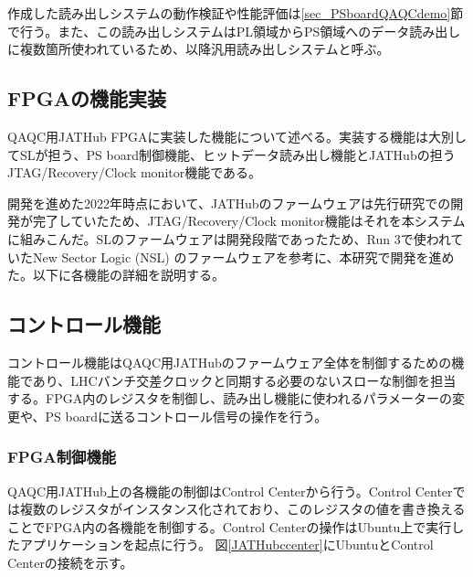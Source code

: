 作成した読み出しシステムの動作検証や性能評価は\ref{sec_PSboardQAQCdemo}節で行う。また、この読み出しシステムはPL領域からPS領域へのデータ読み出しに複数箇所使われているため、以降汎用読み出しシステムと呼ぶ。

\subsection{FPGAの機能実装}
\label{subsec_function}
QAQC用JATHub FPGAに実装した機能について述べる。実装する機能は大別してSLが担う、PS board制御機能、ヒットデータ読み出し機能とJATHubの担うJTAG/Recovery/Clock monitor機能である。


開発を進めた2022年時点において、JATHubのファームウェアは先行研究での開発が完了していたため、JTAG/Recovery/Clock monitor機能はそれを本システムに組みこんだ。SLのファームウェアは開発段階であったため、Run 3で使われていたNew Sector Logic (NSL) のファームウェアを参考に、本研究で開発を進めた。以下に各機能の詳細を説明する。

\subsection*{\textbf{コントロール機能}}
\label{subsubsec_control}
コントロール機能はQAQC用JATHubのファームウェア全体を制御するための機能であり、LHCバンチ交差クロックと同期する必要のないスローな制御を担当する。FPGA内のレジスタを制御し、読み出し機能に使われるパラメーターの変更や、PS boardに送るコントロール信号の操作を行う。

\subsubsection{FPGA制御機能}
QAQC用JATHub上の各機能の制御はControl Centerから行う。Control Centerでは複数のレジスタがインスタンス化されており、このレジスタの値を書き換えることでFPGA内の各機能を制御する。Control Centerの操作はUbuntu上で実行したアプリケーションを起点に行う。
図\ref{JATHubccenter}にUbuntuとControl Centerの接続を示す。

